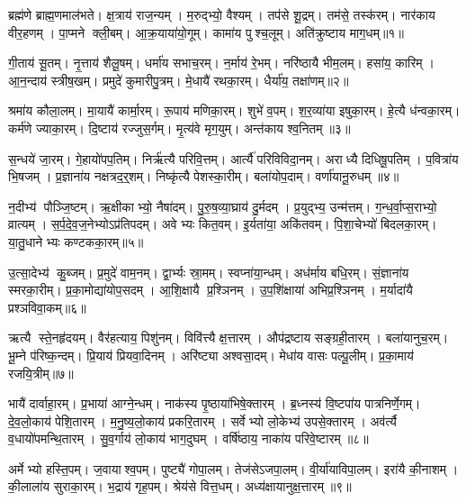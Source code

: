 
\clearpage
{}
\setcounter{anuvakam}{0}
ब्रह्म॑णे ब्राह्म॒णमाल॑भते। क्ष॒त्राय॑ राज॒न्यम्। म॒रुद्भ्यो॒ वैश्यम्। तप॑से शू॒द्रम्। तम॑से॒ तस्क॑रम्। नार॑काय वीर॒हणम्। पा॒प्मने क्ली॒बम्। आ॒क्र॒याया॑यो॒गूम्। कामा॑य पुश्च॒लूम्। अति॑क्रुष्टाय माग॒धम्॥१॥

गी॒ताय॑ सू॒तम्। नृ॒त्ताय॑ शैलू॒षम्। धर्मा॑य सभाच॒रम्। न॒र्माय॑ रे॒भम्। नरि॑ष्ठायै भीम॒लम्। हसा॑य॒ कारिम्। आ॒न॒न्दाय॑ स्त्रीष॒खम्। प्रमुदे॑ कुमारीपु॒त्रम्। मे॒धायै॑ रथका॒रम्। धैर्या॑य॒ तक्षा॑णम्॥२॥

श्रमा॑य कौला॒लम्। मा॒यायै॑ कार्मा॒रम्। रू॒पाय॑ मणिका॒रम्। शुभे॑ व॒पम्। श॒र॒व्या॑या इषुका॒रम्। हे॒त्यै ध॑न्वका॒रम्। कर्म॑णे ज्याका॒रम्। दि॒ष्टाय॑ रज्जुस॒र्गम्। मृ॒त्य॑वे मृग॒युम्। अन्त॑काय श्व॒नितम्॥३॥

स॒न्धये॑ जा॒रम्। गे॒हायो॑पप॒तिम्। निर्\mbox{}ऋ॑त्यै परिवि॒त्तम्। आर्त्यै॑ परिविविदा॒नम्। अराध्यै दिधिषू॒पतिम्। प॒वित्रा॑य भि॒षजम्। प्र॒ज्ञाना॑य नक्षत्रद॒र्॒शम्। निष्कृ॑त्यै पेशस्का॒रीम्। बला॑योप॒दाम्। वर्णा॑यानू॒रुधम्॥४॥

न॒दीभ्य॑ पौञ्जि॒ष्टम्। ऋ॒क्षीकाभ्यो॒ नैषा॑दम्। पु॒रु॒ष॒व्या॒घ्राय॑ दु॒र्मदम्। प्र॒युद्भ्य॒ उन्म॑त्तम्। ग॒न्ध॒र्वा॒प्स॒राभ्यो॒ व्रात्यम्। स॒र्प॒दे॒व॒ज॒नेभ्योऽप्र॑तिपदम्। अवेभ्यः कित॒वम्। इ॒र्यता॑या॒ अकि॑तवम्। पि॒शा॒चेभ्यो॑ बिदलका॒रम्। या॒तु॒धानेभ्यः कण्टकका॒रम्॥५॥

उ॒त्सा॒देभ्य॑ कु॒ब्जम्। प्र॒मुदे॑ वाम॒नम्। द्वा॒र्भ्यः स्रा॒मम्। स्वप्ना॑या॒न्धम्। अध॑र्माय बधि॒रम्। सं॒ज्ञाना॑य स्मरका॒रीम्। प्र॒का॒मोद्या॑योप॒सदम्। आ॒शि॒क्षायै प्र॒श्ञिनम्। उ॒प॒शि॑क्षाया॑ अभिप्र॒श्ञिनम्। म॒र्यादा॑यै प्रश्ञविवा॒कम्॥६॥

ऋत्यै स्ते॒नहृ॑दयम्। वैर॑हत्याय॒ पिशु॑नम्। विवि॑त्त्यै क्ष॒त्तारम्। औप॑द्रष्टाय सङ्ग्रही॒तारम्। बला॑यानुच॒रम्। भू॒म्ने प॑रिष्क॒न्दम्। प्रि॒याय॑ प्रियवा॒दिनम्। अरि॑ष्ट्या अश्वसा॒दम्। मेधा॑य वासः पल्पू॒लीम्। प्र॒का॒माय॑ रजयि॒त्रीम्॥७॥

भायै॑ दार्वाहा॒रम्। प्र॒भाया॑ आग्ने॒न्धम्। नाक॑स्य पृ॒ष्ठाया॑भिषे॒क्तारम्। ब्र॒ध्नस्य॑ वि॒ष्टपा॑य पात्रनिर्णे॒गम्। दे॒व॒लो॒काय॑ पेशि॒तारम्। म॒नु॒ष्य॒लो॒काय॑ प्रकरि॒तारम्। सर्वेभ्यो लो॒केभ्य॑ उपसे॒क्तारम्। अव॑र्त्यै व॒धायो॑पमन्थि॒तारम्। सु॒व॒र्गाय॑ लो॒काय॑ भाग॒दुघम्। वर्\mbox{}षि॑ष्ठाय॒ नाका॑य परिवे॒ष्टारम्॥८॥

अर्मेभ्यो हस्ति॒पम्। ज॒वायाश्व॒पम्। पुष्ट्यै॑ गोपा॒लम्। तेज॑सेऽजपा॒लम्। वी॒र्या॑याविपा॒लम्। इरा॑यै की॒नाशम्। की॒लाला॑य सुराका॒रम्। भ॒द्राय॑ गृह॒पम्। श्रेय॑से वित्त॒धम्। अध्य॑क्षायानुक्ष॒त्तारम्॥९॥


